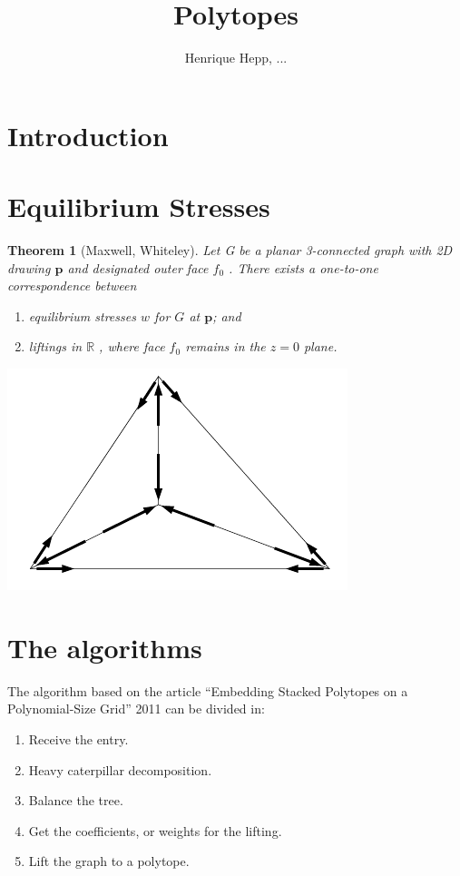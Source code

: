 \documentclass[10pt,a4paper]{article}
\title{Polytopes}
\author{Henrique Hepp, ...}
\begin{document}
\maketitle

\section{Introduction}


\section{Equilibrium Stresses}
\newtheorem{thm}{Theorem}
\begin{thm}[Maxwell, Whiteley]
Let G be a planar 3-connected graph with 2D drawing $\mathbf{p}$ and designated outer face $f_0$ . There exists a one-to-one correspondence between
\begin{enumerate}
\item equilibrium stresses $w$ for $G$ at $\mathbf{p}$; and
\item liftings in $\mathbb{R}$ , where face $f_0$ remains in the $z = 0$ plane.
\end{enumerate}

\end{thm}


\includegraphics[scale=0.8]{stresses.png} 

\section{The algorithms}

The algorithm based on the article ``Embedding Stacked Polytopes on a Polynomial-Size Grid'' 2011 can be divided in:

\begin{enumerate}
\item Receive the entry.
\item Heavy caterpillar decomposition.
\item Balance the tree.
\item Get the coefficients, or weights for the lifting.
\item Lift the graph to a polytope. 
\end{enumerate}
\end{document}
